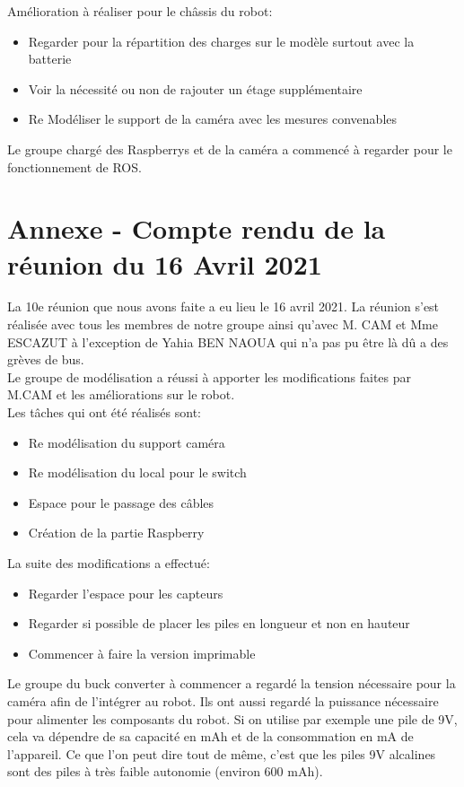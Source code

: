 \documentclass{PackagerQualityN}
\begin{document}
Amélioration à réaliser pour le châssis du robot:
\begin{itemize}
    \item Regarder pour la répartition des charges sur le modèle surtout avec la batterie
    \item Voir la nécessité ou non de rajouter un étage supplémentaire
    \item Re Modéliser le support de la caméra avec les mesures convenables
\end{itemize}


Le groupe chargé des Raspberrys et de la caméra a commencé à regarder pour le fonctionnement de ROS.

\newp
\section*{Annexe - Compte rendu de la réunion du 16 Avril 2021}
La 10e réunion que nous avons faite a eu lieu le 16 avril 2021. La réunion s'est réalisée avec tous les membres de notre groupe ainsi qu'avec M. CAM et Mme ESCAZUT à l'exception de Yahia BEN NAOUA qui n'a pas pu être là dû a des grèves de bus.\\

Le groupe de modélisation a réussi à apporter les modifications faites par M.CAM et les améliorations sur le robot.\\

Les tâches qui ont été réalisés sont:
\begin{itemize}
    \item Re modélisation du support caméra
    \item Re modélisation du local pour le switch
    \item Espace pour le passage des câbles
    \item Création de la partie Raspberry\\
\end{itemize}

La suite des modifications a effectué:
 \begin{itemize}
     \item Regarder l’espace pour les capteurs
     \item Regarder si possible de placer les piles en longueur et non en hauteur
     \item Commencer à faire la version imprimable\\
 \end{itemize}
 
 Le groupe du buck converter à commencer a regardé la tension nécessaire pour la caméra afin de l'intégrer au robot. Ils ont aussi regardé la puissance nécessaire pour alimenter les composants du robot.  Si on utilise par exemple une pile de 9V, cela va dépendre de sa capacité en mAh et de la consommation en mA de l’appareil. Ce que l’on peut dire tout de même, c’est que les piles 9V alcalines sont des piles à très faible autonomie (environ 600 mAh). \\
 
\end{document}
